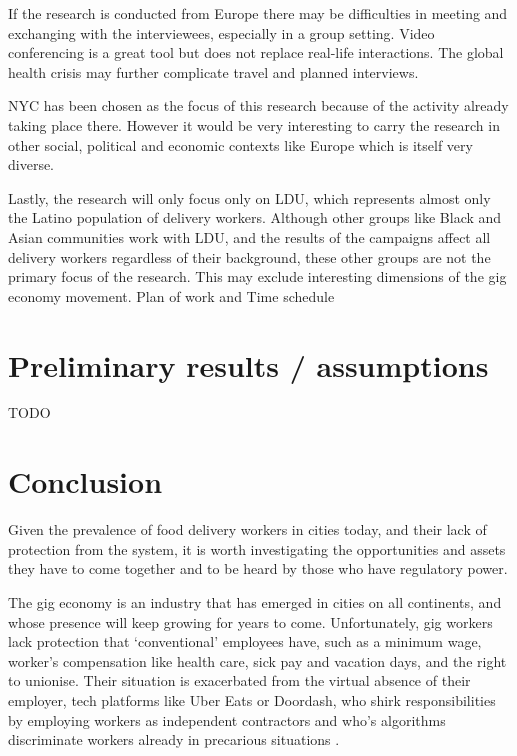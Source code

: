 \documentclass{article}
\begin{document}
If the research is conducted from Europe there may be difficulties in meeting and exchanging with the interviewees, especially in a group setting. Video conferencing is a great tool but does not replace real-life interactions. The global health crisis may further complicate travel and planned interviews.

NYC has been chosen as the focus of this research because of the activity already taking place there. However it would be very interesting to carry the research in other social, political and economic contexts like Europe which is itself very diverse.

Lastly, the research will only focus only on LDU, which represents almost only the Latino population of delivery workers. Although other groups like Black and Asian communities work with LDU, and the results of the campaigns affect all delivery workers regardless of their background, these other groups are not the primary focus of the research. This may exclude interesting dimensions of the gig economy movement. 
Plan of work and Time schedule

\section{Preliminary results / assumptions}

TODO

\section{Conclusion}

Given the prevalence of food delivery workers in cities today, and their lack of protection from the system, it is worth investigating the opportunities and assets they have to come together and to be heard by those who have regulatory power.

The gig economy is an industry that has emerged in cities on all continents, and whose presence will keep growing for years to come. Unfortunately, gig workers lack protection that `conventional’ employees have, such as a minimum wage, worker’s compensation like health care, sick pay and vacation days, and the right to unionise. Their situation is exacerbated from the virtual absence of their employer, tech platforms like Uber Eats or Doordash, who shirk responsibilities by employing workers as independent contractors and who’s algorithms discriminate workers already in precarious situations \parencite{kellogg2020algorithms}.
\end{document}
